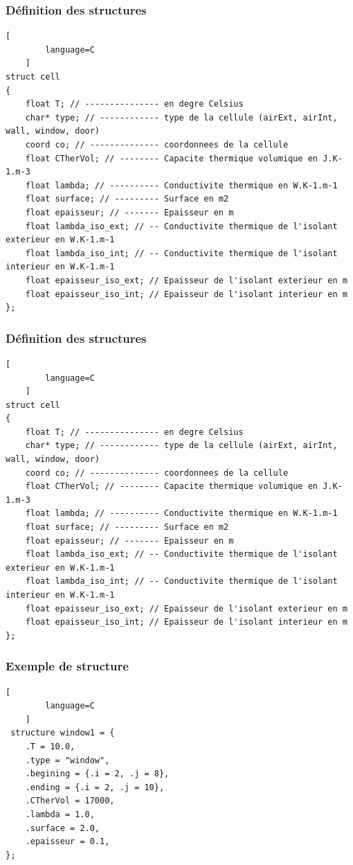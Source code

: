 \documentclass{beamer}
\begin{document}
\begin{frame}[fragile]
    \frametitle{Définition des structures}

    \begin{lstlisting}[
        language=C
    ]
struct cell
{
    float T; // --------------- en degre Celsius
    char* type; // ------------ type de la cellule (airExt, airInt, wall, window, door)
    coord co; // -------------- coordonnees de la cellule
    float CTherVol; // -------- Capacite thermique volumique en J.K-1.m-3
    float lambda; // ---------- Conductivite thermique en W.K-1.m-1
    float surface; // --------- Surface en m2
    float epaisseur; // ------- Epaisseur en m
    float lambda_iso_ext; // -- Conductivite thermique de l'isolant exterieur en W.K-1.m-1
    float lambda_iso_int; // -- Conductivite thermique de l'isolant interieur en W.K-1.m-1
    float epaisseur_iso_ext; // Epaisseur de l'isolant exterieur en m
    float epaisseur_iso_int; // Epaisseur de l'isolant interieur en m
};
    \end{lstlisting}

\end{frame}

\begin{frame}[fragile]
    \frametitle{Définition des structures}
    
    \begin{lstlisting}[
        language=C
    ]
struct cell
{
    float T; // --------------- en degre Celsius
    char* type; // ------------ type de la cellule (airExt, airInt, wall, window, door)
    coord co; // -------------- coordonnees de la cellule
    float CTherVol; // -------- Capacite thermique volumique en J.K-1.m-3
    float lambda; // ---------- Conductivite thermique en W.K-1.m-1
    float surface; // --------- Surface en m2
    float epaisseur; // ------- Epaisseur en m
    float lambda_iso_ext; // -- Conductivite thermique de l'isolant exterieur en W.K-1.m-1
    float lambda_iso_int; // -- Conductivite thermique de l'isolant interieur en W.K-1.m-1
    float epaisseur_iso_ext; // Epaisseur de l'isolant exterieur en m
    float epaisseur_iso_int; // Epaisseur de l'isolant interieur en m
};
    \end{lstlisting}
    
\end{frame}

\begin{frame}[fragile]
    \frametitle{Exemple de structure}
    
    \begin{lstlisting}[
        language=C
    ]
 structure window1 = {
    .T = 10.0,
    .type = "window",
    .begining = {.i = 2, .j = 8},
    .ending = {.i = 2, .j = 10},
    .CTherVol = 17000,
    .lambda = 1.0,
    .surface = 2.0,
    .epaisseur = 0.1,
};
    \end{lstlisting}
\end{frame}
\end{document}
